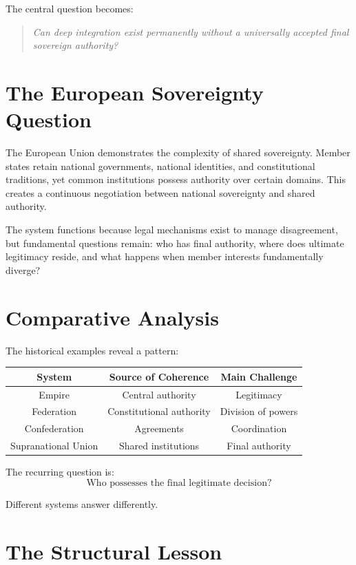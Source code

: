 \documentclass[11pt,openany]{book}
\theoremstyle{plain}
\theoremstyle{definition}
\begin{document}
The central question becomes:
\begin{quote}
\textit{Can deep integration exist permanently without a universally accepted final sovereign authority?}
\end{quote}

\section*{The European Sovereignty Question}

The European Union demonstrates the complexity of shared sovereignty. Member states retain national governments, national identities, and constitutional traditions, yet common institutions possess authority over certain domains. This creates a continuous negotiation between national sovereignty and shared authority.

The system functions because legal mechanisms exist to manage disagreement, but fundamental questions remain: who has final authority, where does ultimate legitimacy reside, and what happens when member interests fundamentally diverge?

\section*{Comparative Analysis}

The historical examples reveal a pattern:

\begin{center}
\begin{tabular}{|c|c|c|}
\hline
\textbf{System} & \textbf{Source of Coherence} & \textbf{Main Challenge} \\
\hline
Empire & Central authority & Legitimacy \\
Federation & Constitutional authority & Division of powers \\
Confederation & Agreements & Coordination \\
Supranational Union & Shared institutions & Final authority \\
\hline
\end{tabular}
\end{center}

The recurring question is:
\[
\boxed{
\text{Who possesses the final legitimate decision?}
}
\]

Different systems answer differently.

\section*{The Structural Lesson}
\end{document}

